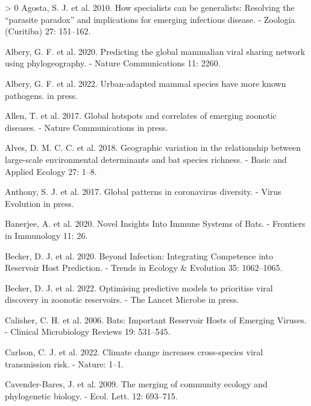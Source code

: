 \documentclass[11pt]{article}
\newlength{\cslhangindent}
\newenvironment{CSLReferences}[3] %
 {%
  \setlength{\parindent}{0pt}
  \ifodd #1 \everypar{\setlength{\hangindent}{\cslhangindent}}\ignorespaces\fi
  \ifnum #2 > 0
  \setlength{\parskip}{#2\baselineskip}
  \fi
 }%
 {}
\begin{document}
\hypertarget{refs}{}
\begin{CSLReferences}{1}{0}
\leavevmode\hypertarget{ref-Agosta2010HowSpe}{}%
Agosta, S. J. et al. 2010. How specialists can be generalists: Resolving
the {``parasite paradox''} and implications for emerging infectious
disease. - Zoologia (Curitiba) 27: 151--162.

\leavevmode\hypertarget{ref-Albery2020PreGlo}{}%
Albery, G. F. et al. 2020. Predicting the global mammalian viral sharing
network using phylogeography. - Nature Communications 11: 2260.

\leavevmode\hypertarget{ref-Albery2022UrbMam}{}%
Albery, G. F. et al. 2022. Urban-adapted mammal species have more known
pathogens. in press.

\leavevmode\hypertarget{ref-Allen2017GloHot}{}%
Allen, T. et al. 2017. Global hotspots and correlates of emerging
zoonotic diseases. - Nature Communications in press.

\leavevmode\hypertarget{ref-Alves2018GeoVar}{}%
Alves, D. M. C. C. et al. 2018. Geographic variation in the relationship
between large-scale environmental determinants and bat species richness.
- Basic and Applied Ecology 27: 1--8.

\leavevmode\hypertarget{ref-Anthony2017GloPat}{}%
Anthony, S. J. et al. 2017. Global patterns in coronavirus diversity. -
Virus Evolution in press.

\leavevmode\hypertarget{ref-Banerjee2020NovIns}{}%
Banerjee, A. et al. 2020. Novel Insights Into Immune Systems of Bats. -
Frontiers in Immunology 11: 26.

\leavevmode\hypertarget{ref-Becker2020InfInt}{}%
Becker, D. J. et al. 2020. Beyond Infection: Integrating Competence into
Reservoir Host Prediction. - Trends in Ecology \& Evolution 35:
1062--1065.

\leavevmode\hypertarget{ref-Becker2022OptPre}{}%
Becker, D. J. et al. 2022. Optimising predictive models to prioritise
viral discovery in zoonotic reservoirs. - The Lancet Microbe in press.

\leavevmode\hypertarget{ref-Calisher2006BatImp}{}%
Calisher, C. H. et al. 2006. Bats: Important Reservoir Hosts of Emerging
Viruses. - Clinical Microbiology Reviews 19: 531--545.

\leavevmode\hypertarget{ref-Carlson2022CliCha}{}%
Carlson, C. J. et al. 2022. Climate change increases cross-species viral
transmission risk. - Nature: 1--1.

\leavevmode\hypertarget{ref-Cavender-Bares2009MerCom}{}%
Cavender-Bares, J. et al. 2009. The merging of community ecology and
phylogenetic biology. - Ecol. Lett. 12: 693--715.


\end{CSLReferences}
\end{document}
